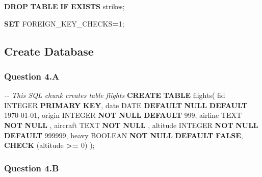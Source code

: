 \documentclass[
]{article}
\newenvironment{Shaded}{\begin{snugshade}}{\end{snugshade}}
\newcommand{\CommentTok}[1]{\textcolor[rgb]{0.56,0.35,0.01}{\textit{#1}}}
\newcommand{\ControlFlowTok}[1]{\textcolor[rgb]{0.13,0.29,0.53}{\textbf{#1}}}
\newcommand{\DataTypeTok}[1]{\textcolor[rgb]{0.13,0.29,0.53}{#1}}
\newcommand{\DecValTok}[1]{\textcolor[rgb]{0.00,0.00,0.81}{#1}}
\newcommand{\KeywordTok}[1]{\textcolor[rgb]{0.13,0.29,0.53}{\textbf{#1}}}
\newcommand{\NormalTok}[1]{#1}
\newcommand{\OperatorTok}[1]{\textcolor[rgb]{0.81,0.36,0.00}{\textbf{#1}}}
\newcommand{\StringTok}[1]{\textcolor[rgb]{0.31,0.60,0.02}{#1}}
\begin{document}
\begin{Shaded}
\begin{Highlighting}[]
\KeywordTok{DROP} \KeywordTok{TABLE} \ControlFlowTok{IF} \KeywordTok{EXISTS}\NormalTok{ strikes;}
\end{Highlighting}
\end{Shaded}

\begin{Shaded}
\begin{Highlighting}[]
\KeywordTok{SET}\NormalTok{ FOREIGN\_KEY\_CHECKS}\OperatorTok{=}\DecValTok{1}\NormalTok{;}
\end{Highlighting}
\end{Shaded}

\hypertarget{create-database}{%
\subsection{Create Database}\label{create-database}}

\hypertarget{question-4.a}{%
\subsubsection{Question 4.A}\label{question-4.a}}

\begin{Shaded}
\begin{Highlighting}[]
\CommentTok{{-}{-} This SQL chunk creates table flights}
\KeywordTok{CREATE} \KeywordTok{TABLE}\NormalTok{ flights(}
\NormalTok{fid }\DataTypeTok{INTEGER} \KeywordTok{PRIMARY} \KeywordTok{KEY}\NormalTok{,}
\DataTypeTok{date} \DataTypeTok{DATE} \KeywordTok{DEFAULT} \KeywordTok{NULL} \KeywordTok{DEFAULT} \StringTok{\textquotesingle{}1970{-}01{-}01\textquotesingle{}}\NormalTok{,}
\NormalTok{origin }\DataTypeTok{INTEGER} \KeywordTok{NOT} \KeywordTok{NULL} \KeywordTok{DEFAULT} \DecValTok{999}\NormalTok{,}
\NormalTok{airline TEXT }\KeywordTok{NOT} \KeywordTok{NULL}\NormalTok{ ,}
\NormalTok{aircraft TEXT }\KeywordTok{NOT} \KeywordTok{NULL}\NormalTok{ ,}
\NormalTok{altitude }\DataTypeTok{INTEGER} \KeywordTok{NOT} \KeywordTok{NULL} \KeywordTok{DEFAULT} \DecValTok{999999}\NormalTok{,}
\NormalTok{heavy }\DataTypeTok{BOOLEAN} \KeywordTok{NOT} \KeywordTok{NULL} \KeywordTok{DEFAULT} \KeywordTok{FALSE}\NormalTok{,}
\KeywordTok{CHECK}\NormalTok{ (altitude }\OperatorTok{\textgreater{}=} \DecValTok{0}\NormalTok{)}
\NormalTok{);}
\end{Highlighting}
\end{Shaded}

\hypertarget{question-4.b}{%
\subsubsection{Question 4.B}\label{question-4.b}}
\end{document}
